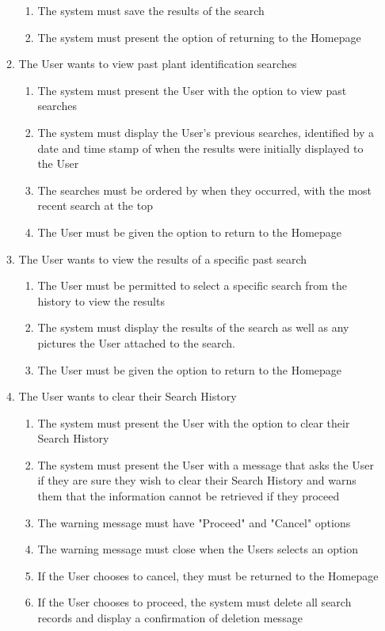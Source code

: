 \documentclass[]{article}
\begin{document}
\begin{enumerate}[{VP}1.]
\begin{enumerate}[{BE1}.1]
\begin{enumerate}
		    \item The system must save the results of the search
		    \item The system must present the option of returning to the Homepage
		\end{enumerate}
		\item The User wants to view past plant identification searches
		\begin{enumerate}
		    \item The system must present the User with the option to view past searches
		    \item The system must display the User's previous searches, identified by a date and time stamp of when the results were initially displayed to the User
		    \item The searches must be ordered by when they occurred, with the most recent search at the top
		    \item The User must be given the option to return to the Homepage
		\end{enumerate}
		\item The User wants to view the results of a specific past search
		\begin{enumerate}
		    \item The User must be permitted to select a specific search from the history to view the results
		    \item The system must display the results of the search as well as any pictures the User attached to the search.
		    \item The User must be given the option to return to the Homepage
		\end{enumerate}
		\item The User wants to clear their Search History
		\begin{enumerate}
		    \item The system must present the User with the option to clear their Search History
		    \item The system must present the User with a message that asks the User if they are sure they wish to clear their Search History and warns them that the information cannot be retrieved if they proceed
		    \item The warning message must have  "Proceed" and "Cancel" options
		    \item The warning message must close when the Users selects an option
		    \item If the User chooses to cancel, they must be returned to the Homepage
		    \item If the User chooses to proceed, the system must delete all search records and display a confirmation of deletion message

\end{enumerate}
\end{enumerate}
\end{enumerate}
\end{document}
